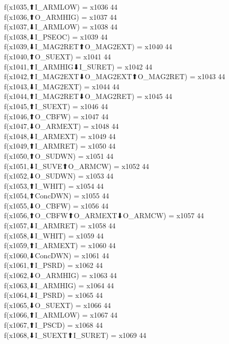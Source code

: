 f(x1035,⬆I_ARMLOW) = x1036 {44} \\
f(x1036,⬆O_ARMHIG) = x1037 {44} \\
f(x1037,⬇I_ARMLOW) = x1038 {44} \\
f(x1038,⬇I_PSEOC) = x1039 {44} \\
f(x1039,⬇I_MAG2RET⬆O_MAG2EXT) = x1040 {44} \\
f(x1040,⬆O_SUEXT) = x1041 {44} \\
f(x1041,⬆I_ARMHIG⬇I_SURET) = x1042 {44} \\
f(x1042,⬆I_MAG2EXT⬇O_MAG2EXT⬆O_MAG2RET) = x1043 {44} \\
f(x1043,⬇I_MAG2EXT) = x1044 {44} \\
f(x1044,⬆I_MAG2RET⬇O_MAG2RET) = x1045 {44} \\
f(x1045,⬆I_SUEXT) = x1046 {44} \\
f(x1046,⬆O_CBFW) = x1047 {44} \\
f(x1047,⬇O_ARMEXT) = x1048 {44} \\
f(x1048,⬇I_ARMEXT) = x1049 {44} \\
f(x1049,⬆I_ARMRET) = x1050 {44} \\
f(x1050,⬆O_SUDWN) = x1051 {44} \\
f(x1051,⬇I_SUVE⬆O_ARMCW) = x1052 {44} \\
f(x1052,⬇O_SUDWN) = x1053 {44} \\
f(x1053,⬆I_WHIT) = x1054 {44} \\
f(x1054,⬆ConcDWN) = x1055 {44} \\
f(x1055,⬇O_CBFW) = x1056 {44} \\
f(x1056,⬆O_CBFW⬆O_ARMEXT⬇O_ARMCW) = x1057 {44} \\
f(x1057,⬇I_ARMRET) = x1058 {44} \\
f(x1058,⬇I_WHIT) = x1059 {44} \\
f(x1059,⬆I_ARMEXT) = x1060 {44} \\
f(x1060,⬇ConcDWN) = x1061 {44} \\
f(x1061,⬆I_PSRD) = x1062 {44} \\
f(x1062,⬇O_ARMHIG) = x1063 {44} \\
f(x1063,⬇I_ARMHIG) = x1064 {44} \\
f(x1064,⬇I_PSRD) = x1065 {44} \\
f(x1065,⬇O_SUEXT) = x1066 {44} \\
f(x1066,⬆I_ARMLOW) = x1067 {44} \\
f(x1067,⬆I_PSCD) = x1068 {44} \\
f(x1068,⬇I_SUEXT⬆I_SURET) = x1069 {44} \\
